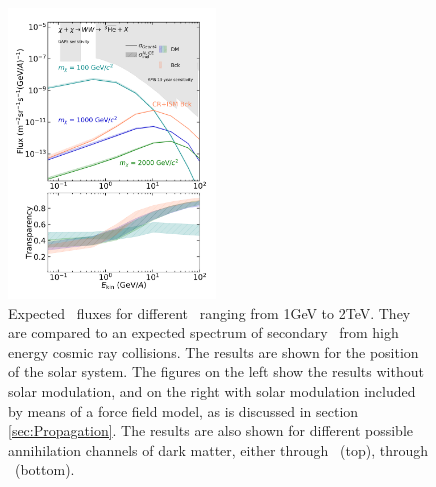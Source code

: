 \begin{figure}[hbtp]
    \includegraphics[width=0.49\textwidth]{figures/he3bar_WW_SM.png}
    
    \caption{Expected \ahe\ fluxes for different \dmm\ ranging from 1GeV to 2TeV. They are compared to an expected spectrum of secondary \ahe\ from high energy cosmic ray collisions. The results are shown for the position of the solar system. The figures on the left show the results without solar modulation, and on the right with solar modulation included by means of a force field model, as is discussed in section \ref{sec:Propagation}. The results are also shown for different possible annihilation channels of dark matter, either through \WW\ (top), through \bb\ (bottom).}
    \label{fig:Results_He3_fluxes_diff_DM_masses}
\end{figure}
